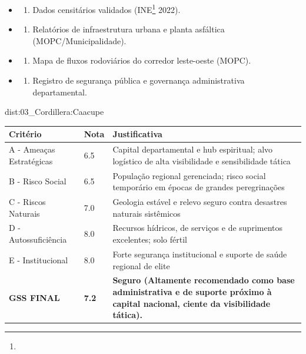 {\begin{itemize}
\tightlist
\item
  \begin{enumerate}
  \def\labelenumi{\arabic{enumi})}
  \tightlist
  \item
    Dados censitários validados (INE\footnote{\fineINE} 2022).
  \end{enumerate}
\item
  \begin{enumerate}
  \def\labelenumi{\arabic{enumi})}
  \setcounter{enumi}{1}
  \tightlist
  \item
    Relatórios de infraestrutura urbana e planta asfáltica
    (MOPC/\allowbreak Municipalidade).
  \end{enumerate}
\item
  \begin{enumerate}
  \def\labelenumi{\arabic{enumi})}
  \setcounter{enumi}{2}
  \tightlist
  \item
    Mapa de fluxos rodoviários do corredor leste-oeste (MOPC).
  \end{enumerate}
\item
  \begin{enumerate}
  \def\labelenumi{\arabic{enumi})}
  \setcounter{enumi}{3}
  \tightlist
  \item
    Registro de segurança pública e governança administrativa
    departamental.
  \end{enumerate}
\end{itemize}}{dist:03_Cordillera:Caacupe}
\begin{table}[ht!]
\small \begin{tabular}{p{3.0cm}p{0.8cm}p{6.0cm}} \toprule
\textbf{Critério} & \textbf{Nota} & \textbf{Justificativa} \\ \midrule
A - Ameaças Estratégicas & 6.5 & Capital departamental e hub espiritual; alvo logístico de alta visibilidade e sensibilidade tática \\
B - Risco Social & 6.5 & População regional gerenciada; risco social temporário em épocas de grandes peregrinações \\
C - Riscos Naturais & 7.0 & Geologia estável e relevo seguro contra desastres naturais sistêmicos \\
D - Autossuficiência & 8.0 & Recursos hídricos, de serviços e de suprimentos excelentes; solo fértil \\
E - Institucional & 8.0 & Forte segurança institucional e suporte de saúde regional de elite \\
\midrule \textbf{GSS FINAL} & \textbf{7.2} & \textbf{Seguro (Altamente recomendado como base administrativa e de suporte próximo à capital nacional, ciente da visibilidade tática).} \\ \bottomrule \end{tabular}
\end{table}
